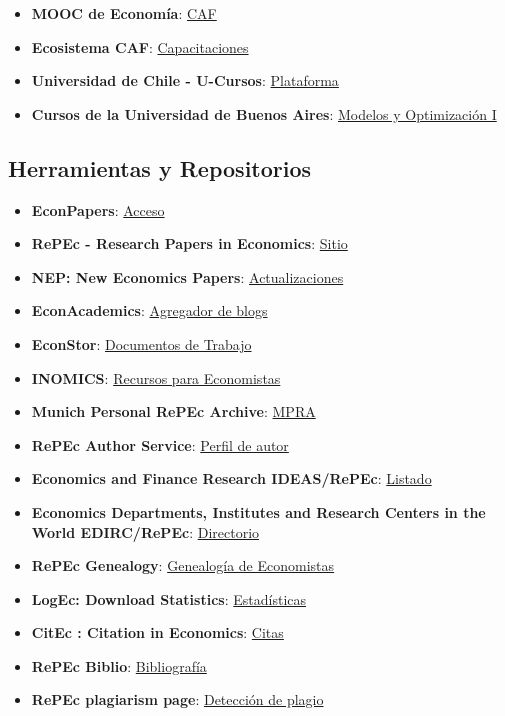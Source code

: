 \documentclass[
  jou,
  floatsintext,
  longtable,
  a4paper,
  nolmodern,
  notxfonts,
  notimes,
  colorlinks=true,linkcolor=blue,citecolor=blue,urlcolor=blue]{apa7}
\providecommand{\tightlist}{%
  \setlength{\itemsep}{0pt}\setlength{\parskip}{0pt}}
\begin{document}
\begin{itemize}
\tightlist
\item
  \textbf{MOOC de Economía}:
  \href{https://www.caf.com/es/actualidad/capacitacion/2023/08/mooc-de-economia/}{CAF}
\item
  \textbf{Ecosistema CAF}:
  \href{https://capacitaciones.caf.com/}{Capacitaciones}
\item
  \textbf{Universidad de Chile - U-Cursos}:
  \href{https://uchile.cl/presentacion/vicerrectoria-de-asuntos-economicos-y-gestion-institucional/convenio-de-desempeno/sistemas-de-gestion/u-cursos}{Plataforma}
\item
  \textbf{Cursos de la Universidad de Buenos Aires}:
  \href{https://campusgrado.fi.uba.ar/course/view.php?id=303}{Modelos y
  Optimización I}
\end{itemize}

\subsection{Herramientas y
Repositorios}\label{herramientas-y-repositorios}

\begin{itemize}
\tightlist
\item
  \textbf{EconPapers}: \href{https://econpapers.repec.org/}{Acceso}
\item
  \textbf{RePEc - Research Papers in Economics}:
  \href{http://repec.org/}{Sitio}
\item
  \textbf{NEP: New Economics Papers}:
  \href{https://nep.repec.org/}{Actualizaciones}
\item
  \textbf{EconAcademics}:
  \href{https://www.econacademics.org/}{Agregador de blogs}
\item
  \textbf{EconStor}: \href{https://www.econstor.eu/}{Documentos de
  Trabajo}
\item
  \textbf{INOMICS}: \href{https://inomics.com/}{Recursos para
  Economistas}
\item
  \textbf{Munich Personal RePEc Archive}:
  \href{https://mpra.ub.uni-muenchen.de/}{MPRA}
\item
  \textbf{RePEc Author Service}:
  \href{https://authors.repec.org/}{Perfil de autor}
\item
  \textbf{Economics and Finance Research \textbar{} IDEAS/RePEc}:
  \href{https://ideas.repec.org/}{Listado}
\item
  \textbf{Economics Departments, Institutes and Research Centers in the
  World \textbar{} EDIRC/RePEc}:
  \href{https://edirc.repec.org/}{Directorio}
\item
  \textbf{RePEc Genealogy}:
  \href{https://genealogy.repec.org/}{Genealogía de Economistas}
\item
  \textbf{LogEc: Download Statistics}:
  \href{https://logec.repec.org/}{Estadísticas}
\item
  \textbf{CitEc : Citation in Economics}:
  \href{https://citec.repec.org/}{Citas}
\item
  \textbf{RePEc Biblio}: \href{https://biblio.repec.org/}{Bibliografía}
\item
  \textbf{RePEc plagiarism page}:
  \href{https://plagiarism.repec.org/}{Detección de plagio}
\end{itemize}
\end{document}
